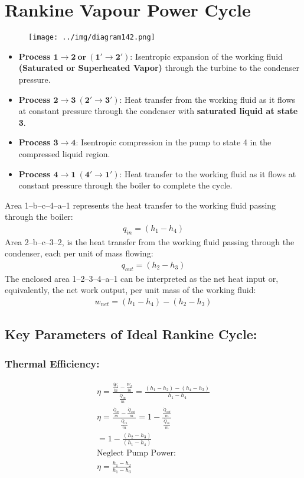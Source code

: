 \documentclass[class=report, crop=false, 12pt,a4paper]{standalone}
\numberwithin{equation}{section}
\begin{document}
\section{Rankine Vapour Power Cycle}
\begin{figure}[H]
  \centering
  \texttt{[image: ../img/diagram142.png]}
  \caption{}
\end{figure}
\begin{itemize}[noitemsep]
  \item \textbf{Process $\mathbf{1\rightarrow 2 \ \text{or} \ (1'\rightarrow 2')}$}: Isentropic expansion of the working fluid \textbf{(Saturated or Superheated Vapor)} through the turbine to the condenser pressure.
  \item \textbf{Process $\mathbf{2\rightarrow 3 \ (2'\rightarrow 3')}$}: Heat transfer from the working fluid as it flows at constant pressure through the condenser with \textbf{saturated liquid at state 3}.
  \item \textbf{Process $\mathbf{3\rightarrow 4}$}: Isentropic compression in the pump to state 4 in the compressed liquid region.
  \item \textbf{Process $\mathbf{4\rightarrow 1 \ (4'\rightarrow 1')}$}: Heat transfer to the working fluid as it flows at constant pressure through the boiler to complete the cycle.
\end{itemize}
Area 1–b–c–4–a–1 represents the heat transfer to the working fluid passing through the boiler:
\begin{gather}
  q_{in}=(h_1-h_4)
\end{gather}
Area 2–b–c–3–2, is the heat transfer from the working fluid passing through the condenser, each per unit of mass flowing: 
\begin{gather}
  q_{out}=(h_2-h_3)
\end{gather}
The enclosed area 1–2–3–4–a–1 can be interpreted as the net heat input or, equivalently, the net work output, per unit mass of the working fluid:
\begin{gather}
  w_{net}=(h_1-h_4)-(h_2-h_3)
\end{gather}
\subsection{Key Parameters of Ideal Rankine Cycle:}
\subsubsection{Thermal Efficiency:}
\begin{gather}
  \eta = \frac{\frac{\dot{W}_t}{\dot{m}} - \frac{\dot{W}_p}{\dot{m}}}{\frac{\dot{Q}_{in}}{\dot{m}}} = \frac{(h_1-h_2)-(h_4-h_3)}{h_1-h_4} \\[5pt]
  \eta = \frac{\frac{\dot{Q}_{in}}{\dot{m}} - \frac{\dot{Q}_{out}}{\dot{m}}}{\frac{\dot{Q}_{in}}{\dot{m}}} = 1-\frac{\frac{\dot{Q}_{out}}{\dot{m}}}{\frac{\dot{Q}_{in}}{\dot{m}}} \\[5pt]
  = 1-\frac{(h_2-h_3)}{(h_1-h_4)} \\[5pt]
  \text{Neglect Pump Power:} \\[5pt]
  \eta = \frac{h_1-h_2}{h_1-h_3}
\end{gather}
\end{document}
